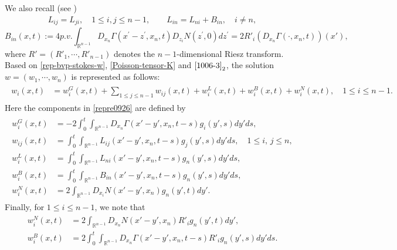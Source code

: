 \documentclass{amsart}
\numberwithin{equation}{section}
\newcommand{\Rn}{{\mathbb R}^{n-1}}
\newcommand{\Ga}{\Gamma}
\begin{document}
We also recall (see \cite{So})
\begin{align}\label{1006-3}
L_{ij} = L_{ji},\quad 1 \leq i,j \leq n-1,  \qquad
  L_{in} =
L_{ni}  + B_{in},\quad  i \neq n,
\end{align}
\begin{equation*}%
B_{in}(x,t) := 4p. v.\int_{\Rn} D_{x_n} \Ga(x^\prime -z^\prime ,
x_n, t)  D_{z_i} N( z^{\prime},0) dz^\prime =2R'_i (D_{x_n}\Gamma (\cdot, x_n, t))(x'),
\end{equation*}
where $ R' = (R'_1, \cdots, R'_{n-1} )$ denotes the $n-1$-dimensional Riesz transform. 
Based on     \eqref{rep-bvp-stokes-w}, \eqref{Poisson-tensor-K}  and  $\eqref{1006-3}_2$, the solution  $w = (w_1, \cdots, w_n)$ is represented as follows:
\begin{align}\label{repre0926}
\begin{split}
w_i(x,t) &  = w_i^G (x,t) +  \sum_{1 \leq j \leq n-1}  w_{ij}(x,t)  + w^{L}_{i} (x,t) + w_i^B(x,t) + w_i^N(x,t),\quad 1 \leq i \leq n-1.
\end{split}
\end{align}
Here  the components in \eqref{repre0926} are defined by
\begin{align}\label{260409-1}
\begin{split}
w_i^G(x,t)& = -2 \int_0^t \int_{\Rn} D_{x_n} \Ga(x' -y', x_n, t-s) g_i(y',s) dy'ds,\\
w_{ij} (x,t) & = \int_0^t \int_{\Rn} L_{ij} (x'-y', x_n, t-s) g_j(y',s)  dy' ds, \quad  1 \leq  i, \, j \leq n,\\
 w^{L}_{i} (x,t) & =  \int_0^t \int_{\Rn} L_{ni} (x'-y', x_n, t-s) g_n(y',s)  dy' ds,\\
w^B_i (x,t) &  =\int_0^t \int_{\Rn}  B_{in}(x' -y', x_n, t-s) g_n(y',s) dy'ds, \\
w^N_i (x,t)  &= 2   \int_{\Rn} D_{x_i} N(x'-y', x_n)  g_n (y',t) dy'.
\end{split}
\end{align}
Finally, for    $1 \leq i \leq n-1$, we note that  
\begin{align}\label{NB0926}
\begin{split}
w^N_i (x,t)  &=  2\int_{\Rn} D_{x_n} N(x'-y', x_n) R'_i g_n (y',t) dy', \\
w^B_i (x,t) &  =2 \int_0^t \int_{\Rn} D_{x_n} \Ga(x' -y', x_n, t-s) R'_ig_n(y',s) dy'ds.
\end{split}
\end{align}
\end{document}
